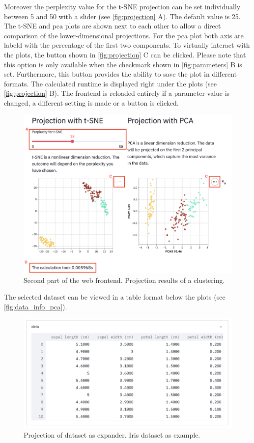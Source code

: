 Moreover the perplexity value for the t-SNE projection can be set individually between 5 and 50 with a slider (see \autoref{fig:projection} A). The default value is 25. The \acrshort{t-SNE} and \acrshort{pca} plots are shown next to each other to allow a direct comparison of the lower-dimensional projections. For the \acrshort{pca} plot both axis are labeld with the percentage of the first two components. To virtually interact with the plots, the button shown in \autoref{fig:projection} C can be clicked. Please note that this option is only available when the checkmark shown in \autoref{fig:parameters} B is set. Furthermore, this button provides the ability to save the plot in different formats.
The calculated runtime is displayed right under the plots (see \autoref{fig:projection} B).
The frontend is reloaded entirely if a parameter value is changed, a different setting is made or a button is clicked. 
\begin{figure}[H]
	\centering
	\includegraphics[width=\linewidth]{modules/web_frontend/projection_letters}
	\caption{Second part of the web frontend. Projection results of a clustering.}\label{fig:projection}
\end{figure}

The selected dataset can be viewed in a table format below the plots (see \autoref{fig:data_info_pca}).

\begin{figure}[H]
	\centering
	\includegraphics[width=\linewidth]{modules/web_frontend/data_info_pca.png}
	\caption{Projection of dataset as expander. Iris dataset as example.}\label{fig:data_info_pca}
\end{figure}


